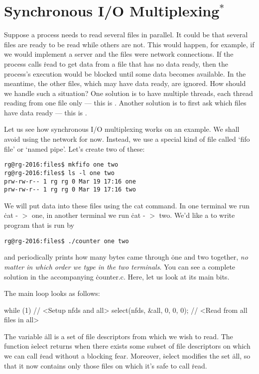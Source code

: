\section*{Synchronous I/O Multiplexing${}^*$}

Suppose a process needs to read several files in parallel.
It could be that several files are ready to be read while others are not.
This would happen, for example,
  if we would implement a server and the files were network connections.
If the process calls \.{read} to get data from a file that has no data ready,
  then the process's execution would be blocked until some data becomes available.
In the meantime,
  the other files, which may have data ready, are ignored.
How should we handle such a situation?
One solution is to have multiple threads, each thread reading from one file only ---
  this is .
Another solution is to first ask which files have data ready ---
  this is .

Let us see how synchronous I/O multiplexing works on an example.
We shall avoid using the network for now.
Instead, we use a special kind of file called `fifo file' or `named pipe'.
Let's create two of these:
\begin{verbatim}
rg@rg-2016:files$ mkfifo one two
rg@rg-2016:files$ ls -l one two
prw-rw-r-- 1 rg rg 0 Mar 19 17:16 one
prw-rw-r-- 1 rg rg 0 Mar 19 17:16 two
\end{verbatim}
We will put data into these files using the cat command.
In one terminal we run \.{cat - $>$ one},
  in another terminal we run \.{cat - $>$ two}.
We'd like a to write program that is run by
\begin{verbatim}
rg@rg-2016:files$ ./counter one two
\end{verbatim}
and periodically prints how many bytes came through \.{one} and \.{two} together,
  \emph{no matter in which order we type in the two terminals}.
You can see a complete solution in the accompanying \.{counter.c}.
Here, let us look at its main bits.

The main loop looks as follows:
\begin{ccode}
while (1) {
  // <Setup nfds and all>
  select(nfds, &all, 0, 0, 0);
  // <Read from all files in all>
}
\end{ccode}
The variable \.{all} is a set of file descriptors from which we wish to read.
The function \.{select} returns when there exists some subset of file descriptors
  on which we can call \.{read} without a blocking fear.
Moreover, \.{select} modifies the set \.{all},
  so that it now contains only those files on which it's safe to call \.{read}.

